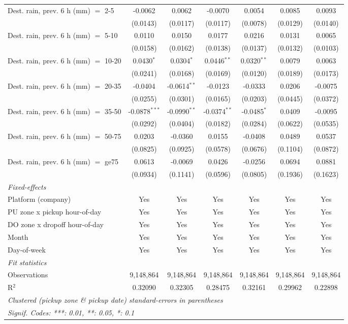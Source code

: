\begin{tabular}{lcccccc}
   Dest. rain, prev. 6 h (mm) $=$ 2-5 & -0.0062 & 0.0062 & -0.0070 & 0.0054 & 0.0085 & 0.0093\\
    & (0.0143) & (0.0117) & (0.0117) & (0.0078) & (0.0129) & (0.0140)\\
   Dest. rain, prev. 6 h (mm) $=$ 5-10 & 0.0110 & 0.0150 & 0.0177 & 0.0216 & 0.0131 & 0.0065\\
    & (0.0158) & (0.0162) & (0.0138) & (0.0137) & (0.0132) & (0.0103)\\
   Dest. rain, prev. 6 h (mm) $=$ 10-20 & 0.0430$^{*}$ & 0.0304$^{*}$ & 0.0446$^{**}$ & 0.0320$^{**}$ & 0.0079 & 0.0063\\
    & (0.0241) & (0.0168) & (0.0169) & (0.0120) & (0.0189) & (0.0173)\\
   Dest. rain, prev. 6 h (mm) $=$ 20-35 & -0.0404 & -0.0614$^{**}$ & -0.0123 & -0.0333 & 0.0206 & -0.0075\\
    & (0.0255) & (0.0301) & (0.0165) & (0.0203) & (0.0445) & (0.0372)\\
   Dest. rain, prev. 6 h (mm) $=$ 35-50 & -0.0878$^{***}$ & -0.0990$^{**}$ & -0.0374$^{**}$ & -0.0485$^{*}$ & 0.0409 & -0.0095\\
    & (0.0292) & (0.0404) & (0.0182) & (0.0284) & (0.0622) & (0.0535)\\
   Dest. rain, prev. 6 h (mm) $=$ 50-75 & 0.0203 & -0.0360 & 0.0155 & -0.0408 & 0.0489 & 0.0537\\
    & (0.0825) & (0.0925) & (0.0578) & (0.0676) & (0.1104) & (0.0872)\\
   Dest. rain, prev. 6 h (mm) $=$ ge75 & 0.0613 & -0.0069 & 0.0426 & -0.0256 & 0.0694 & 0.0881\\
    & (0.0934) & (0.1141) & (0.0596) & (0.0805) & (0.1936) & (0.1623)\\
   \midrule
   \emph{Fixed-effects}\\
   Platform (company) & Yes & Yes & Yes & Yes & Yes & Yes\\
   PU zone x pickup hour-of-day & Yes & Yes & Yes & Yes & Yes & Yes\\
   DO zone x dropoff hour-of-day & Yes & Yes & Yes & Yes & Yes & Yes\\
   Month & Yes & Yes & Yes & Yes & Yes & Yes\\
   Day-of-week & Yes & Yes & Yes & Yes & Yes & Yes\\
   \midrule
   \emph{Fit statistics}\\
   Observations & 9,148,864 & 9,148,864 & 9,148,864 & 9,148,864 & 9,148,864 & 9,148,864\\
   R$^2$ & 0.32090 & 0.32305 & 0.28475 & 0.32161 & 0.29962 & 0.22898\\
   \midrule \midrule
   \multicolumn{7}{l}{\emph{Clustered (pickup zone \& pickup date) standard-errors in parentheses}}\\
   \multicolumn{7}{l}{\emph{Signif. Codes: ***: 0.01, **: 0.05, *: 0.1}}\\
\end{tabular}
 

